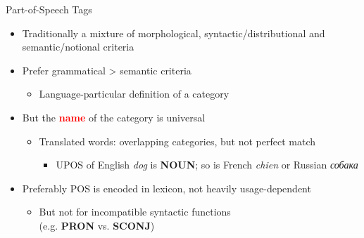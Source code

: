 \documentclass[10pt, compress, aspectratio=169]{beamer}
\renewcommand{\alert}[1]{\textcolor{red}{\textbf{#1}}}
\newcommand{\upos}[1]{\textbf{\color{blue}#1}}
\newcommand{\ru}[1]{{\rufont #1}}
\begin{document}
\begin{frame}{Part-of-Speech Tags}
\begin{itemize}
\item Traditionally a mixture of morphological, syntactic/distributional and semantic/notional criteria
\item Prefer grammatical > semantic criteria
  \begin{itemize}
  \item Language-particular definition of a category
  \end{itemize}
\item But the \alert{\textbf{name}} of the category is universal
  \begin{itemize}
  \item Translated words: overlapping categories, but not perfect match
      \begin{itemize}
      \item UPOS of English \textit{dog} is \upos{NOUN}; so is French \textit{chien} or Russian \textit{\ru{собака}}
      \end{itemize}
  \end{itemize}
\item Preferably POS is encoded in lexicon, not heavily usage-dependent
  \begin{itemize}
  \item But not for incompatible syntactic functions\\(e.g. \upos{PRON} vs. \upos{SCONJ})
  \end{itemize}
\end{itemize}
\end{frame}
\end{document}
